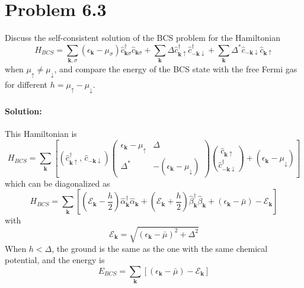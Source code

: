 \section*{Problem 6.3}
Discuss the self-consistent solution of the BCS problem for the Hamiltonian
\begin{equation}
    H_{BCS} 
    = \sum_{\bm{k}, \sigma} (\epsilon_{\bm{k}} - \mu_{\sigma}) \hat{c}^{\dagger}_{\bm{k}\sigma} \hat{c}_{\bm{k}\sigma}
    + \sum_{\bm{k}} \Delta \hat{c}^{\dagger}_{\bm{k}\uparrow } \hat{c}^{\dagger}_{\bm{-k}\downarrow }
    + \sum_{\bm{k}} \Delta^* \hat{c}_{\bm{-k}\downarrow } \hat{c}_{\bm{k}\uparrow }
\end{equation}
when $\mu_{\uparrow} \neq \mu_{\downarrow}$, and compare the energy of the BCS state with the free Fermi gas for different $h = \mu_{\uparrow} - \mu_{\downarrow}$.
\paragraph*{Solution:}
This Hamiltonian is
\begin{equation}
    H_{BCS} 
    = \sum_{\bm{k}} \left[
        (\hat{c}^{\dagger}_{\bm{k}\uparrow } ,\, \hat{c}_{\bm{-k}\downarrow } )
        \begin{pmatrix}
            \epsilon_{\bm{k}} - \mu_{\uparrow} & \Delta \\
            \Delta^* & -(\epsilon_{\bm{k}} - \mu_{\downarrow})
        \end{pmatrix}
        \binom{\hat{c}_{\bm{k}\uparrow}}{\hat{c}^{\dagger}_{\bm{-k}\downarrow}}
        + (\epsilon_{\bm{k}} - \mu_{\downarrow})
    \right]
\end{equation}
which can be diagonalized as 
\begin{equation}
    H_{BCS}
    = \sum_{\bm{k}} \left[
        (\mathcal{E}_{\bm{k}} - \frac{h}{2}) 
        \hat{\alpha}^{\dagger}_{\bm{k}} \hat{\alpha}_{\bm{k}} 
        + (\mathcal{E}_{\bm{k}} + \frac{h}{2}) 
        \hat{\beta}^{\dagger}_{\bm{k}}\hat{\beta}_{\bm{k}}
        + \left( \epsilon_{\bm{k}} - \bar{\mu}\right)
        - \mathcal{E}_{\bm{k}}
    \right]
\end{equation}
with 
\begin{equation}
    \mathcal{E}_{\bm{k}} = \sqrt{(\epsilon_{\bm{k}}-\bar{\mu})^2 + \Delta^2}
\end{equation}
When $h<\Delta$, the ground is the same as the one with the same chemical potential, and the energy is 
\begin{equation}
    E_{BCS} = \sum_{\bm{k}} \left[
        (\epsilon_{\bm{k}} - \bar{\mu}) - \mathcal{E}_{\bm{k}}
    \right] 
\end{equation}
